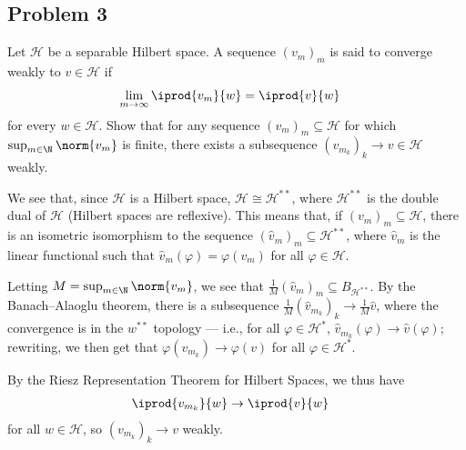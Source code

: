 \documentclass[10pt]{mypackage}
\begin{document}
\subsection{Problem 3}%
\begin{problem}
  Let $\mathcal{H}$ be a separable Hilbert space. A sequence $\left( v_m \right)_m$ is said to converge weakly to $v\in \mathcal{H}$ if
  \begin{align*}
    \lim_{m\rightarrow\infty} \iprod{v_m}{w} &= \iprod{v}{w}
  \end{align*}
  for every $w\in \mathcal{H}$. Show that for any sequence $\left( v_m \right)_m\subseteq \mathcal{H}$ for which $\sup_{m\in\N} \norm{v_m}$ is finite, there exists a subsequence $\left( v_{m_{k}} \right)_k\rightarrow v\in \mathcal{H}$ weakly.
\end{problem}
We see that, since $\mathcal{H}$ is a Hilbert space, $\mathcal{H}\cong \mathcal{H}^{\ast\ast}$, where $\mathcal{H}^{\ast\ast}$ is the double dual of $\mathcal{H}$ (Hilbert spaces are reflexive). This means that, if $\left( v_m \right)_m\subseteq \mathcal{H}$, there is an isometric isomorphism to the sequence $\left( \hat{v}_m \right)_m\subseteq \mathcal{H}^{\ast\ast}$, where $\hat{v}_m$ is the linear functional such that $\hat{v}_m(\varphi) = \varphi\left( v_m \right)$ for all $\varphi\in \mathcal{H}$.\newline

Letting $M = \sup_{m\in \N} \norm{v_m}$, we see that $\frac{1}{M} \left( \hat{v}_m \right)_m\subseteq B_{\mathcal{H}^{\ast\ast}}$. By the Banach--Alaoglu theorem, there is a subsequence $\frac{1}{M}\left( \hat{v}_{m_k} \right)_k\rightarrow \frac{1}{M}\hat{v}$, where the convergence is in the $w^{\ast\ast}$ topology --- i.e., for all $\varphi\in \mathcal{H}^{\ast}$, $\hat{v}_{m_{k}}\left( \varphi \right)\rightarrow \hat{v}\left( \varphi \right)$; rewriting, we then get that $\varphi\left( v_{m_{k}} \right) \rightarrow \varphi\left( v \right)$ for all $\varphi\in \mathcal{H}^{\ast}$.\newline

By the Riesz Representation Theorem for Hilbert Spaces, we thus have
\begin{align*}
  \iprod{v_{m_{k}}}{w} &\rightarrow \iprod{v}{w}
\end{align*}
for all $w\in \mathcal{H}$, so $\left( v_{m_{k}} \right)_k\rightarrow v$ weakly.
\end{document}
